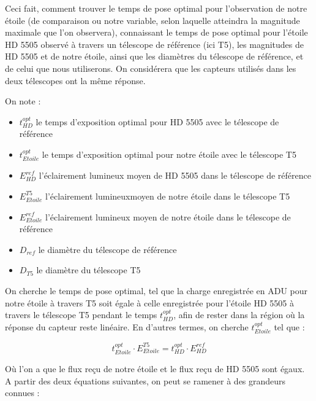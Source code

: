 \documentclass[10pt,french, openany]{book}
\begin{document}
    Ceci fait, comment trouver le temps de pose optimal pour l'observation de notre étoile (de comparaison ou notre variable, selon laquelle atteindra la magnitude maximale que l'on observera), connaissant le temps de pose optimal pour l'étoile HD 5505 observé à travers un télescope de référence (ici T5), les magnitudes de HD 5505 et de notre étoile, ainsi que les diamètres du télescope de référence, et de celui que nous utiliserons.
    On considérera que les capteurs utilisés dans les deux télescopes ont la même réponse.
    
    On note :
    
    \begin{itemize}
    
        \item $t^{opt}_{HD}$ le temps d'exposition optimal pour HD 5505 avec le télescope de référence
        \item $t^{opt}_{Etoile}$ le temps d'exposition optimal pour notre étoile avec le télescope T5
        \item $E_{HD}^{ref}$ l'éclairement lumineux moyen de HD 5505 dans le télescope de référence
        \item $E_{Etoile}^{T5}$ l'éclairement lumineuxmoyen de notre étoile dans le télescope T5
        \item $E_{Etoile}^{ref}$ l'éclairement lumineux moyen de notre étoile dans le télescope de référence
        \item $D_{ref}$ le diamètre du télescope de référence
        \item $D_{T5}$ le diamètre du télescope T5
        
    \end{itemize}
    
    On cherche le temps de pose optimal, tel que la charge enregistrée en ADU pour notre étoile à travers T5 soit égale à celle enregistrée pour l'étoile HD 5505 à travers le télescope T5 pendant le temps $t^{opt}_{HD}$, afin de rester dans la région où la réponse du capteur reste linéaire. En d'autres termes, on cherche $t^{opt}_{Etoile}$ tel que :
    
    \begin{equation}
        \label{temps_de_pose}
        t^{opt}_{Etoile} \cdot E_{Etoile}^{T5} = t^{opt}_{HD} \cdot E_{HD}^{ref}
    \end{equation}
    
    Où l'on a que le flux reçu de notre étoile et le flux reçu de HD 5505 sont égaux.
    A partir des deux équations suivantes, on peut se ramener à des grandeurs connues \cite{site:wiki:magnitude, site:wiki:eclairement}:
    
\end{document}
